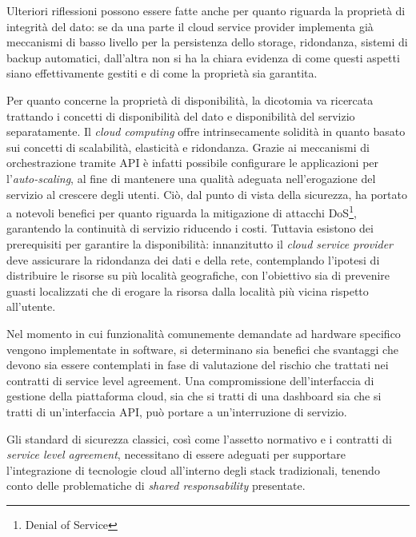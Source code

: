 \documentclass[../main.tex]{subfiles}
\begin{document}
Ulteriori riflessioni possono essere fatte anche per quanto riguarda la proprietà di integrità del dato: se da una parte il cloud service provider implementa già meccanismi di basso livello per la persistenza dello storage, ridondanza, sistemi di backup automatici, dall'altra non si ha la chiara evidenza di come questi aspetti siano effettivamente gestiti e di come la proprietà sia garantita.


Per quanto concerne la proprietà di disponibilità, la dicotomia va ricercata trattando i concetti di disponibilità del dato e disponibilità del servizio separatamente.
Il \textit{cloud computing} offre intrinsecamente solidità in quanto basato sui concetti di scalabilità, elasticità e ridondanza. Grazie ai meccanismi di orchestrazione tramite API è infatti possibile configurare le applicazioni per l'\textit{auto-scaling}, al fine di mantenere una qualità adeguata nell'erogazione del servizio al crescere degli utenti. Ciò, dal punto di vista della sicurezza, ha portato a notevoli benefici per quanto riguarda la mitigazione di attacchi DoS\footnote{Denial of Service}, garantendo la continuità di servizio riducendo i costi.
Tuttavia esistono dei prerequisiti per garantire la disponibilità: innanzitutto il \textit{cloud service provider} deve assicurare la ridondanza dei dati e della rete, contemplando l'ipotesi di distribuire le risorse su più località geografiche, con l'obiettivo sia di prevenire guasti localizzati che di erogare la risorsa dalla località più vicina rispetto all'utente.

Nel momento in cui funzionalità comunemente demandate ad hardware specifico vengono implementate in software, si determinano sia benefici che svantaggi che devono sia essere contemplati in fase di valutazione del rischio che trattati nei contratti di service level agreement. Una compromissione dell'interfaccia di gestione della piattaforma cloud, sia che si tratti di una dashboard sia che si tratti di un'interfaccia API, può portare a un'interruzione di servizio.

Gli standard di sicurezza classici, così come l'assetto normativo e i contratti di \textit{service level agreement}, necessitano di essere adeguati per supportare l'integrazione di tecnologie cloud all'interno degli stack tradizionali, tenendo conto delle problematiche di \textit{shared responsability} presentate.
\end{document}
